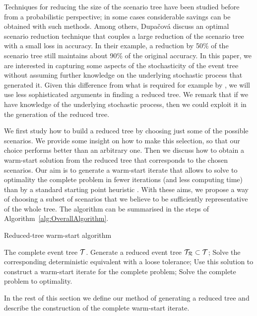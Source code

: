 Techniques for reducing the size of the scenario tree have been studied 
before from a probabilistic perspective; in some cases considerable 
savings can be obtained with such methods. Among others, 
Dupa\v{c}ov{\'a} \etal \cite{Dupacova} discuss an optimal scenario 
reduction technique that couples a large reduction of the scenario 
tree with a small loss in accuracy. In their example, a reduction by 
50\% of the scenario tree still maintains about 90\% of the original 
accuracy.
In this paper, we are interested in capturing some aspects of the 
stochasticity of the event tree without assuming further knowledge on 
the underlying stochastic process that generated it. Given this difference 
from what is required for example by \cite{Dupacova}, we will use less 
sophisticated arguments in finding a reduced tree.
We remark that if we have knowledge of the underlying stochastic process,
then we could exploit it in the generation of the reduced tree.

We first study how to build a reduced tree by choosing just 
some of the possible scenarios. We provide some insight on how to make 
this selection, so that our choice performs better than an arbitrary 
one.
Then we discuss how to obtain a warm-start solution from the reduced 
tree that corresponds to the chosen scenarios.
Our aim is to generate a warm-start iterate that allows to solve to 
optimality the complete problem in fewer iterations (and less computing 
time) than by a standard starting point heuristic \cite{Mehrotra92}.
With these aims, we propose a way of choosing a subset of scenarios 
that we believe to be sufficiently representative of the whole tree.
The algorithm can be summarised in the steps of
Algorithm~\ref{alg:OverallAlgorithm}.
%
\begin{algorithm}[h]
  \caption{Reduced-tree warm-start algorithm}
  \begin{algorithmic}[0]  \label{alg:OverallAlgorithm}
    \REQUIRE The complete event tree $\mathcal{T}$.
    \smallskip
    \STATE Generate a reduced event tree $\mathcal{T}_\mathcal{R}\subset\mathcal{T}$;
    \smallskip
    \STATE Solve the corresponding deterministic equivalent with a loose 
           tolerance;
    \smallskip
    \STATE Use this solution to construct a warm-start iterate for the 
    complete problem;
    \smallskip
    \STATE Solve the complete problem to optimality.
  \end{algorithmic}
\end{algorithm}

In the rest of this section we define our method of generating a 
reduced tree and describe the construction of the complete warm-start 
iterate.

